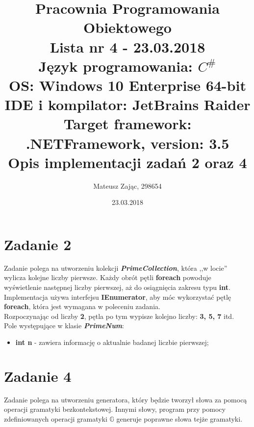 \documentclass[12pt]{article}
\begin{document}
\title{
\textbf{Pracownia Programowania Obiektowego\\}
\textbf{Lista nr 4 - 23.03.2018\\}
\textbf{Język programowania:} \(C^{\#}\)\\
\textbf{OS:} Windows 10 Enterprise 64-bit\\
\textbf{IDE i kompilator:} JetBrains Raider\\
\textbf{Target framework:} .NETFramework, version: 3.5\\
Opis implementacji zadań 2 oraz 4
}

\author {Mateusz Zając, 298654}

\date {23.03.2018} 

\maketitle

\newpage

\section{Zadanie 2}

	Zadanie polega na utworzeniu kolekcji \textbf{\textit{PrimeCollection}}, która ,,w locie'' wylicza kolejne liczby pierwsze. Każdy obrót pętli \textbf{foreach} powoduje wyświetlenie następnej liczby pierwszej, aż do osiągnięcia zakresu typu \textbf{int}. Implementacja używa interfejsu \textbf{IEnumerator}, aby móc wykorzystać pętlę \textbf{foreach}, która jest wymagana w poleceniu zadania. \\
	Rozpoczynając od liczby \textbf{2}, pętla po tym wypisze kolejno liczby: \textbf{3, 5, 7} itd.\\
	
	Pole występujące w klasie \textbf{\textit{Prime\textunderscore Num}}:
	\begin{itemize}
	\item \textbf{int n} - zawiera informację o aktualnie badanej liczbie pierwszej;
	\end{itemize}
	

\newpage

\section{Zadanie 4}
	Zadanie polega na utworzeniu generatora, który będzie tworzył słowa za pomocą operacji gramatyki bezkontekstowej. Innymi słowy, program przy pomocy zdefiniowanych operacji gramatyki \(\mathbb{G}\) generuje poprawne słowa tejże gramatyki.\\
\end{document}
